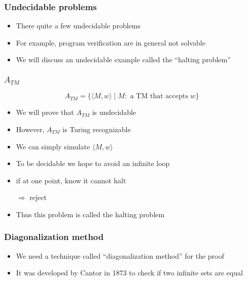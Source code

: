 




\begin{frame}[allowframebreaks] \frametitle{Undecidable problems}
  \begin{itemize}
\item There quite a few undecidable problems

\item For example, program verification are in general not solvable

\item We will discuss an undecidable example called the ``halting problem''
  
\end{itemize}\end{frame} \begin{frame}[allowframebreaks] \frametitle{$A_{TM}$}
\begin{equation*}
  A_{TM}=\{
\langle  M,w\rangle \mid M: \mbox{ a TM that accepts } w\}
\end{equation*}
  \begin{itemize}
\item We will prove that $A_{TM}$ is undecidable
\item However, $A_{TM}$ is Turing recognizable

\item We can simply simulate $\langle  M,w\rangle $
\item To be decidable we hope to avoid an infinite loop

\item [] if at one point, know it cannot halt

$\Rightarrow$ reject
\item Thus this problem is called the halting problem
\end{itemize}\end{frame} \begin{frame}[allowframebreaks] \frametitle{Diagonalization method}
  \begin{itemize}
\item We need a technique called ``diagonalization method'' for the proof
\item It was developed by Cantor  in 1873
to check if two  infinite sets are equal


\end{itemize}
\end{frame}
